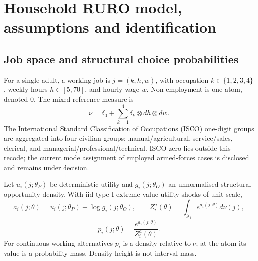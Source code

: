 \documentclass[11pt,a4paper]{article}
\begin{document}
\section{Household RURO model, assumptions and identification}

\subsection{Job space and structural choice probabilities}

For a single adult, a working job is $j=(k,h,w)$, with occupation
$k\in\{1,2,3,4\}$, weekly hours $h\in[5,70]$, and hourly wage $w$. Non-employment
is one atom, denoted $0$. The mixed reference measure is
\begin{equation}
\nu=\delta_0+\sum_{k=1}^{4}\delta_k\otimes dh\otimes dw.
\end{equation}
The International Standard Classification of Occupations (ISCO) one-digit
groups are aggregated into four civilian groups: manual/agricultural,
service/sales, clerical, and managerial/professional/technical. ISCO zero lies
outside this recode; the current mode assignment of employed armed-forces cases
is disclosed and remains under decision.

Let $u_i(j;\theta_P)$ be deterministic utility and $g_i(j;\theta_O)$ an
unnormalised structural opportunity density. With iid type-I extreme-value
utility shocks of unit scale,
\begin{equation}
a_i(j;\theta)=u_i(j;\theta_P)+\log g_i(j;\theta_O),\qquad
Z_i^a(\theta)=\int_{\mathcal J_i}e^{a_i(j;\theta)}d\nu(j),
\end{equation}
\begin{equation}
p_i(j;\theta)=\frac{e^{a_i(j;\theta)}}{Z_i^a(\theta)}.
\label{eq:choice}
\end{equation}
For continuous working alternatives $p_i$ is a density relative to $\nu$; at
the atom its value is a probability mass. Density height is not interval mass.
\end{document}
